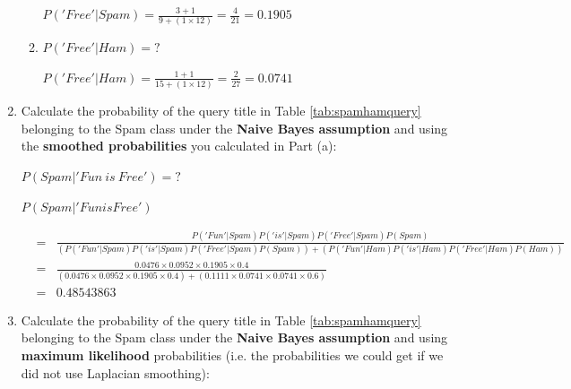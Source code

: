 \documentclass[--SOLUTION-OPTION--]{ditpaper}
\begin{document}
\begin{enumerate}
\begin{enumerate}
					\begin{answer}
						$P('Free'|Spam) = \frac{3+1}{9 + (1 \times 12)} = \frac{4}{21} = 0.1905$
					\end{answer}
				\item $P('Free'|Ham)=?$
					\begin{answer}
						$P('Free'|Ham) = \frac{1+1}{15 + (1 \times 12)} = \frac{2}{27} = 0.0741$
					\end{answer}
			\end{enumerate}
		\item Calculate the probability of the query title in Table \ref{tab:spamhamquery} belonging to the Spam class under the \textbf{Naive Bayes assumption} and using the \textbf{smoothed probabilities} you calculated in Part (a):		
			\begin{center}
				$P(Spam|'Fun~is~Free')=?$
			\end{center}
			\begin{answer}
				$P(Spam|'Fun is Free')$ 
				\begin{scriptsize}
				\begin{eqnarray*}
					&=& \frac{P('Fun'|Spam)P('is'|Spam)P('Free'|Spam)P(Spam)}{(P('Fun'|Spam)P('is'|Spam)P('Free'|Spam)P(Spam))+(P('Fun'|Ham)P('is'|Ham)P('Free'|Ham)P(Ham))}\\
					&=& \frac{0.0476 \times 0.0952 \times 0.1905 \times 0.4}{(0.0476 \times 0.0952 \times 0.1905 \times 0.4) + (0.1111 \times 0.0741 \times  0.0741 \times 0.6)}\\
					&=& 0.48543863
				\end{eqnarray*}
				\end{scriptsize}
			\end{answer}
		\item Calculate the probability of the query title in Table \ref{tab:spamhamquery} belonging to the Spam class under the \textbf{Naive Bayes assumption} and using \textbf{maximum likelihood} probabilities (i.e. the probabilities we could get if we did not use Laplacian smoothing):	

\end{enumerate}
\end{document}
